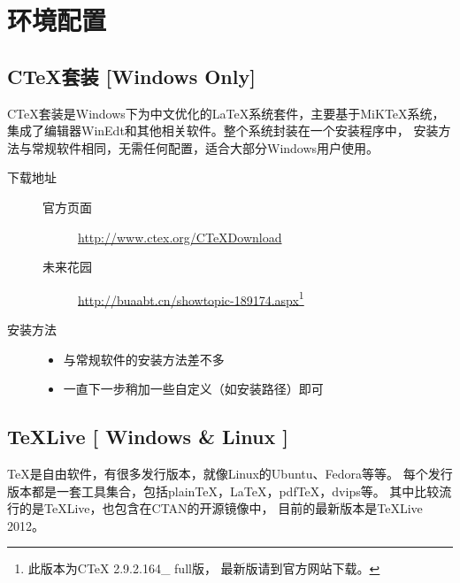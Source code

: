 \chapter{环境配置}

\section{C\TeX{}套装 [Windows Only]}

C\TeX{}套装是Windows下为中文优化的\LaTeX{}系统套件，主要基于MiKTeX系统，
集成了编辑器WinEdt和其他相关软件。整个系统封装在一个安装程序中，
安装方法与常规软件相同，无需任何配置，适合大部分Windows用户使用。

\begin{description}
    \item[下载地址] \hfill
    \begin{description}
        \item[官方页面]
            \url{http://www.ctex.org/CTeXDownload}
        \item[未来花园]
            \url{http://buaabt.cn/showtopic-189174.aspx}\footnote{此版本为CTeX 2.9.2.164\_ full版，
            最新版请到官方网站下载。}
    \end{description}
    \item[安装方法] \hfill
        \begin{itemize}
            \item[] 与常规软件的安装方法差不多
            \item[] 一直下一步稍加一些自定义（如安装路径）即可
        \end{itemize}
\end{description}

\section{\TeX{}Live [ Windows \& Linux ]}

\TeX{}是自由软件，有很多发行版本，就像Linux的Ubuntu、Fedora等等。
每个发行版本都是一套工具集合，包括plain\TeX{}，\LaTeX{}，pdf\TeX{}，dvips等。
其中比较流行的是\TeX{}Live，也包含在CTAN的开源镜像中，
目前的最新版本是\TeX{}Live 2012。

